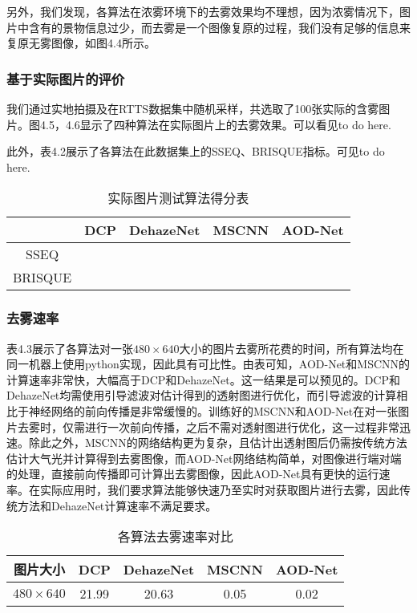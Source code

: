 \documentclass[a4paper, 12pt]{report}
\begin{document}
另外，我们发现，各算法在浓雾环境下的去雾效果均不理想，因为浓雾情况下，图片中含有的景物信息过少，而去雾是一个图像复原的过程，我们没有足够的信息来复原无雾图像，如图4.4所示。

\subsubsection{基于实际图片的评价\quad}
我们通过实地拍摄及在RTTS数据集中随机采样，共选取了100张实际的含雾图片。图4.5，4.6显示了四种算法在实际图片上的去雾效果。可以看见to do here.

此外，表4.2展示了各算法在此数据集上的SSEQ、BRISQUE指标。可见to do here.
\begin{table}[htbp]
  \centering
  \caption{实际图片测试算法得分表}
    \begin{tabular}{c|c|c|c|c}
    \hline
         & DCP    & DehazeNet  & MSCNN    & AOD-Net  \\
    \hline
    SSEQ &   &  &     &  \\
    \hline
     BRISQUE     &       &       &   & \\
     \hline
  
    \end{tabular}%
  \label{tab:4.2}%
\end{table}%

\subsubsection{去雾速率\quad}
表4.3展示了各算法对一张$480 \times 640$大小的图片去雾所花费的时间，所有算法均在同一机器上使用python实现，因此具有可比性。由表可知，AOD-Net和MSCNN的计算速率非常快，大幅高于DCP和DehazeNet。这一结果是可以预见的。DCP和DehazeNet均需使用引导滤波对估计得到的透射图进行优化，而引导滤波的计算相比于神经网络的前向传播是非常缓慢的。训练好的MSCNN和AOD-Net在对一张图片去雾时，仅需进行一次前向传播，之后不需对透射图进行优化，这一过程非常迅速。除此之外，MSCNN的网络结构更为复杂，且估计出透射图后仍需按传统方法估计大气光并计算得到去雾图像，而AOD-Net网络结构简单，对图像进行端对端的处理，直接前向传播即可计算出去雾图像，因此AOD-Net具有更快的运行速率。在实际应用时，我们要求算法能够快速乃至实时对获取图片进行去雾，因此传统方法和DehazeNet计算速率不满足要求。

\begin{table}[htbp]
\centering
\caption{各算法去雾速率对比}
\begin{tabular}{c|c|c|c|c}
\hline
图片大小 & DCP & DehazeNet	& MSCNN	& AOD-Net \\
\hline
$480\times  640$ & 21.99 & 20.63 & 0.05 & 0.02\\
\hline
\end{tabular}
\label{tab: 4.3}
\end{table}
\end{document}
